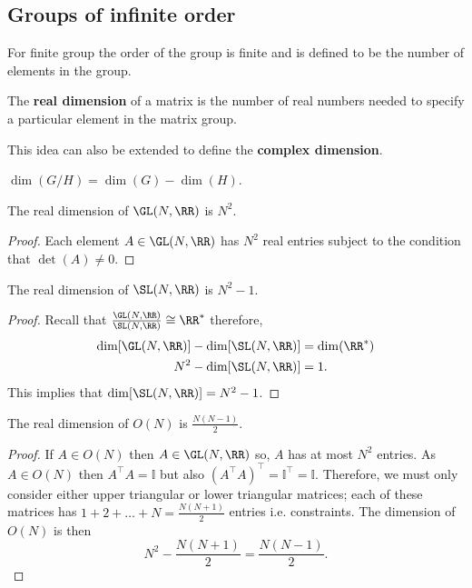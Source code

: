 \documentclass[12pt, a4paper]{article}
\begin{document}
\subsection{Groups of infinite order}

For finite group the order of the group is finite and is defined to be the number of elements in the group.

\begin{definition}
    The \textbf{real dimension} of a matrix is the number of real numbers needed to specify a particular element in the matrix group.
\end{definition}

\begin{mdremark}
    This idea can also be extended to define the \textbf{complex dimension}.
\end{mdremark}

\begin{mdthm}
    \(\dim(G/H)=\dim(G)-\dim(H)\).
\end{mdthm}

\begin{theorem}
    The real dimension of \(\GL(N,\RR)\) is \(N^2\).
\end{theorem}

\begin{proof}
    Each element \(A \in \GL(N,\RR)\) has \(N^2\) real entries subject to the condition that \(\det(A) \neq 0\).
\end{proof}

\begin{theorem}
    The real dimension of \(\SL(N,\RR)\) is \(N^2-1\).
\end{theorem}

\begin{proof}
    Recall that \(\frac{\GL(N,\RR)}{\SL(N,\RR)} \cong \RR^*\) therefore,
    \[\begin{aligned}
        \dim[\GL(N,\RR)]-\dim[\SL(N,\RR)]&=\dim(\RR^*) \\
        N^2 - \dim[\SL(N,\RR)] &=1.
    \end{aligned}\]
    This implies that \(\dim[\SL(N,\RR)]=N^2-1\).
\end{proof}

\begin{theorem}
    The real dimension of \(O(N)\) is \(\frac{N(N-1)}{2}\).
\end{theorem}

\begin{proof}
    If \(A \in O(N)\) then \(A \in \GL(N,\RR)\) so, \(A\) has at most \(N^2\) entries. As \(A \in O(N)\) then \(A^{\top}A = \mathbb{I}\) but also \(\left( A^{\top}A \right)^{\top}=\mathbb{I}^{\top}=\mathbb{I}\). Therefore, we must only consider either upper triangular or lower triangular matrices; each of these matrices has \(1+2+\ldots+N=\frac{N(N+1)}{2}\) entries i.e. constraints. The dimension of \(O(N)\) is then 
    \[N^2-\frac{N(N+1)}{2}=\frac{N(N-1)}{2}.\]
\end{proof}
\end{document}
